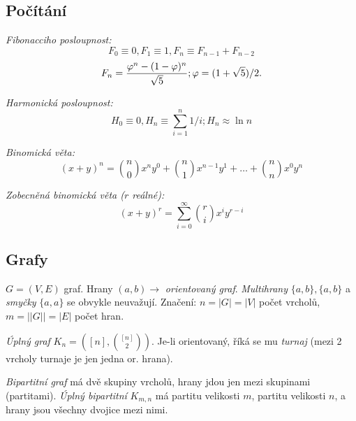 
\subsection{Počítání}







{\it Fibonacciho posloupnost:}
$$F_0 \equiv 0, F_1 \equiv 1, F_n \equiv F_{n-1} + F_{n-2}$$
$$F_n = {\varphi^n - (1-\varphi)^n \over \sqrt{5}}; \varphi = (1+\sqrt{5})/2.$$

{\it Harmonická posloupnost:}
$$H_0 \equiv 0, H_n \equiv \sum_{i=1}^n 1/i; H_n \approx \ln n$$

{\it Binomická věta:}
$$(x+y)^n = {n \choose 0}x^n y^0 + {n \choose 1}x^{n-1} y^1 + \dots + {n \choose n}x^0 y^n$$

{\it Zobecněná binomická věta ($r$ reálné):}
$$(x+y)^r = \sum_{i=0}^{\infty} {r \choose i} x^{i}y^{r-i} $$

\subsection{Grafy}

$G = (V,E)$ graf. Hrany $(a,b) \rightarrow$ {\it orientovaný graf}.
{\it Multihrany} $\{a,b\},\{a,b\}$ a {\it smyčky} $\{a,a\}$ se obvykle neuvažují.
Značení: $n = |G| = |V|$ počet vrcholů, $m = ||G|| = |E|$ počet hran.

{\it Úplný graf} $K_n = ([n],{[n] \choose 2})$. Je-li orientovaný, říká
se mu {\it turnaj} (mezi 2 vrcholy turnaje je jen jedna or. hrana).

{\it Bipartitní graf} má dvě skupiny vrcholů, hrany jdou jen mezi skupinami (partitami).
{\it Úplný bipartitní} $K_{m,n}$ má partitu velikosti $m$, partitu velikosti $n$, a hrany
jsou všechny dvojice mezi nimi.

